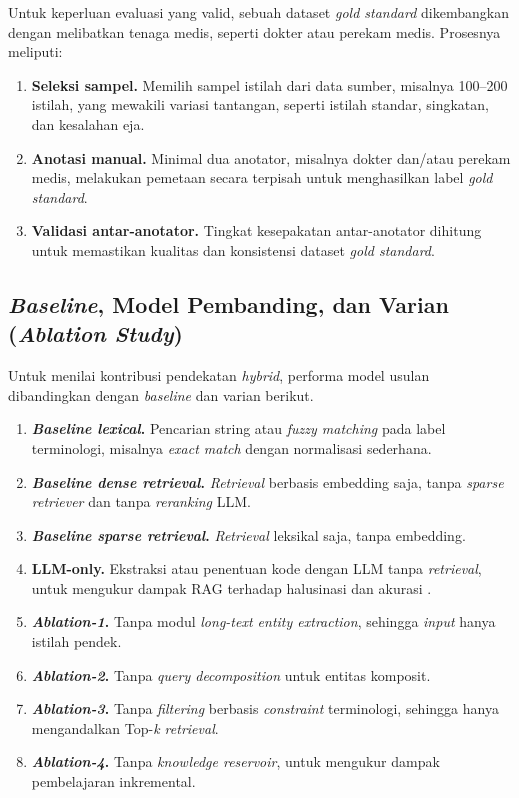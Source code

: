 Untuk keperluan evaluasi yang valid, sebuah dataset \textit{gold standard} dikembangkan dengan melibatkan tenaga medis, seperti dokter atau perekam medis. Prosesnya meliputi:

\begin{enumerate}
    \item \textbf{Seleksi sampel.} Memilih sampel istilah dari data sumber, misalnya 100--200 istilah, yang mewakili variasi tantangan, seperti istilah standar, singkatan, dan kesalahan eja.
    \item \textbf{Anotasi manual.} Minimal dua anotator, misalnya dokter dan/atau perekam medis, melakukan pemetaan secara terpisah untuk menghasilkan label \textit{gold standard}.
    \item \textbf{Validasi antar-anotator.} Tingkat kesepakatan antar-anotator dihitung untuk memastikan kualitas dan konsistensi dataset \textit{gold standard}.
\end{enumerate}

\subsection{\textit{Baseline}, Model Pembanding, dan Varian (\textit{Ablation Study})}

Untuk menilai kontribusi pendekatan \textit{hybrid}, performa model usulan dibandingkan dengan \textit{baseline} dan varian berikut.

\begin{enumerate}
    \item \textbf{\textit{Baseline lexical}.} Pencarian string atau \textit{fuzzy matching} pada label terminologi, misalnya \textit{exact match} dengan normalisasi sederhana.
    \item \textbf{\textit{Baseline dense retrieval}.} \textit{Retrieval} berbasis embedding saja, tanpa \textit{sparse retriever} dan tanpa \textit{reranking} LLM.
    \item \textbf{\textit{Baseline sparse retrieval}.} \textit{Retrieval} leksikal saja, tanpa embedding.
    \item \textbf{LLM-only.} Ekstraksi atau penentuan kode dengan LLM tanpa \textit{retrieval}, untuk mengukur dampak RAG terhadap halusinasi dan akurasi \citep{gilani_cde-mapper_2025,yu_large_2026}.
    \item \textbf{\textit{Ablation-1}.} Tanpa modul \textit{long-text entity extraction}, sehingga \textit{input} hanya istilah pendek.
    \item \textbf{\textit{Ablation-2}.} Tanpa \textit{query decomposition} untuk entitas komposit.
    \item \textbf{\textit{Ablation-3}.} Tanpa \textit{filtering} berbasis \textit{constraint} terminologi, sehingga hanya mengandalkan Top-\textit{k retrieval}.
    \item \textbf{\textit{Ablation-4}.} Tanpa \textit{knowledge reservoir}, untuk mengukur dampak pembelajaran inkremental.
\end{enumerate}

